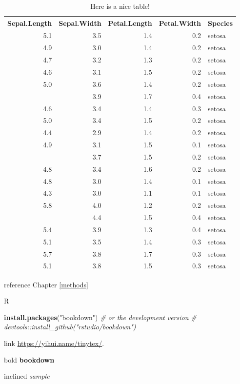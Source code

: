 \documentclass[
]{book}
\newenvironment{Shaded}{\begin{snugshade}}{\end{snugshade}}
\newcommand{\CommentTok}[1]{\textcolor[rgb]{0.56,0.35,0.01}{\textit{#1}}}
\newcommand{\KeywordTok}[1]{\textcolor[rgb]{0.13,0.29,0.53}{\textbf{#1}}}
\newcommand{\NormalTok}[1]{#1}
\newcommand{\StringTok}[1]{\textcolor[rgb]{0.31,0.60,0.02}{#1}}
\begin{document}
\begin{table}

\caption{\label{tab:nice-tab}Here is a nice table!}
\centering
\begin{tabular}[t]{rrrrl}
\toprule
Sepal.Length & Sepal.Width & Petal.Length & Petal.Width & Species\\
\midrule
5.1 & 3.5 & 1.4 & 0.2 & setosa\\
4.9 & 3.0 & 1.4 & 0.2 & setosa\\
4.7 & 3.2 & 1.3 & 0.2 & setosa\\
4.6 & 3.1 & 1.5 & 0.2 & setosa\\
5.0 & 3.6 & 1.4 & 0.2 & setosa\\
\addlinespace
5.4 & 3.9 & 1.7 & 0.4 & setosa\\
4.6 & 3.4 & 1.4 & 0.3 & setosa\\
5.0 & 3.4 & 1.5 & 0.2 & setosa\\
4.4 & 2.9 & 1.4 & 0.2 & setosa\\
4.9 & 3.1 & 1.5 & 0.1 & setosa\\
\addlinespace
5.4 & 3.7 & 1.5 & 0.2 & setosa\\
4.8 & 3.4 & 1.6 & 0.2 & setosa\\
4.8 & 3.0 & 1.4 & 0.1 & setosa\\
4.3 & 3.0 & 1.1 & 0.1 & setosa\\
5.8 & 4.0 & 1.2 & 0.2 & setosa\\
\addlinespace
5.7 & 4.4 & 1.5 & 0.4 & setosa\\
5.4 & 3.9 & 1.3 & 0.4 & setosa\\
5.1 & 3.5 & 1.4 & 0.3 & setosa\\
5.7 & 3.8 & 1.7 & 0.3 & setosa\\
5.1 & 3.8 & 1.5 & 0.3 & setosa\\
\bottomrule
\end{tabular}
\end{table}

reference
Chapter \ref{methods}

R

\begin{Shaded}
\begin{Highlighting}[]
\KeywordTok{install.packages}\NormalTok{(}\StringTok{"bookdown"}\NormalTok{)}
\CommentTok{# or the development version}
\CommentTok{# devtools::install_github("rstudio/bookdown")}
\end{Highlighting}
\end{Shaded}

link
\url{https://yihui.name/tinytex/}.

bold
\textbf{bookdown}

inclined
\emph{sample}

  
\end{document}
